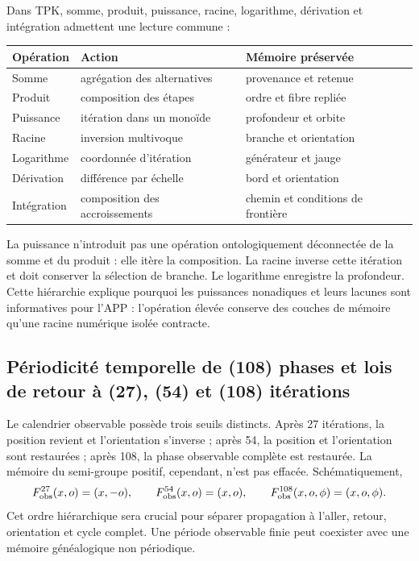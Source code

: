 \begin{proposition}
Dans TPK, somme, produit, puissance, racine, logarithme, dérivation et intégration
admettent une lecture commune :
\begin{center}
\begin{tabular}{@{}p{}p{}p{}@{}}
\toprule
Opération & Action & Mémoire préservée \\
\midrule
Somme & agrégation des alternatives & provenance et retenue \\
Produit & composition des étapes & ordre et fibre repliée \\
Puissance & itération dans un monoïde & profondeur et orbite \\
Racine & inversion multivoque & branche et orientation \\
Logarithme & coordonnée d’itération & générateur et jauge \\
Dérivation & différence par échelle & bord et orientation \\
Intégration & composition des accroissements & chemin et conditions de frontière \\
\bottomrule
\end{tabular}
\end{center}
\end{proposition}

La puissance n’introduit pas une opération ontologiquement déconnectée de la somme et du
produit : elle itère la composition. La racine inverse cette itération et doit conserver
la sélection de branche. Le logarithme enregistre la profondeur. Cette hiérarchie explique
pourquoi les puissances nonadiques et leurs lacunes sont informatives pour l’APP :
l’opération élevée conserve des couches de mémoire qu’une racine numérique isolée
contracte.

\subsection{Périodicité temporelle de (108) phases et lois de retour à (27), (54) et (108) itérations}

Le calendrier observable possède trois seuils distincts. Après 27 itérations,
la position revient et l’orientation s’inverse ; après 54, la position
et l’orientation sont restaurées ; après 108, la phase observable complète est restaurée. La mémoire
du semi-groupe positif, cependant, n’est pas effacée. Schématiquement,
\[
F_{\rm obs}^{27}(x,o)=(x,-o),\qquad
F_{\rm obs}^{54}(x,o)=(x,o),\qquad
F_{\rm obs}^{108}(x,o,\phi)=(x,o,\phi).
\]
Cet ordre hiérarchique sera crucial pour séparer propagation à l’aller, retour,
orientation et cycle complet. Une période observable finie peut coexister avec
une mémoire généalogique non périodique.

